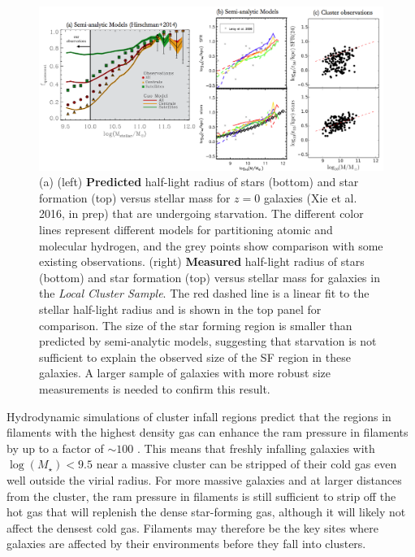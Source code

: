 \documentclass[11pt, preprint]{aastex}
\begin{document}
\begin{figure}[h!]
\begin{center}
\includegraphics[width=\textwidth]{model-comparisonv2.png}
\end{center}
\caption{\small (a)  (left) {\bf Predicted} half-light radius
  of stars (bottom) and star formation (top) versus stellar mass for
  $z = 0 $ galaxies (Xie et al. 2016, in prep) that are undergoing starvation.
  The different color lines represent different models for partitioning
  atomic and molecular hydrogen, and the grey points show comparison
  with some existing observations.  
(right) {\bf Measured} half-light radius of stars (bottom) and star
formation (top) versus stellar mass for galaxies in the {\it Local Cluster Sample}.  The
red dashed line is a linear fit to the stellar half-light radius and
is shown in the top panel for comparison.  The size of the star
forming region is smaller than predicted by semi-analytic models,
suggesting that starvation is not sufficient to explain the observed
size of the SF region in these galaxies.  A larger sample of galaxies
with more robust size measurements is needed to confirm this result.}
\label{lizhi_comparison}
\end{figure}
Hydrodynamic simulations of cluster infall regions predict that
the regions in filaments with the highest density gas can enhance the ram pressure in
filaments by up to a factor of $\sim 100$ \citep{bahe13}.  This 
means that freshly infalling galaxies with $\log(M_\star)<9.5$ near a massive
cluster can be stripped of their cold gas even well outside the virial
radius.  For more massive galaxies and at larger distances from the
cluster, the ram pressure in filaments is still sufficient to strip
off the hot gas that will replenish the dense star-forming gas,
although it will likely not affect the densest cold gas.  
Filaments may therefore be the key
sites where galaxies are affected by their environments before they fall into
clusters.   
\end{document}
